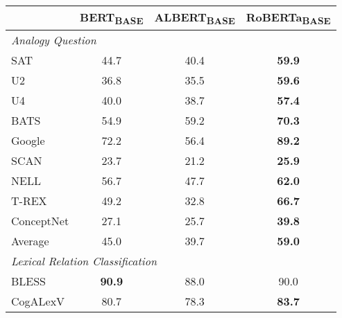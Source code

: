 \documentclass[3p]{elsarticle}
\begin{document}
{\begin{table}[t]
\centering
\begin{tabular}{lccc}
\toprule
                                         & BERT\textsubscript{BASE} & ALBERT\textsubscript{BASE} & RoBERTa\textsubscript{BASE} \\ \midrule
\multicolumn{4}{l}{\textit{Analogy Question}} \\
SAT                                      & 44.7                      & 40.4                        & \textbf{59.9}                         \\
U2                                       & 36.8                      & 35.5                        & \textbf{59.6}                         \\
U4                                       & 40.0                      & 38.7                        & \textbf{57.4}                         \\
BATS                                     & 54.9                      & 59.2                        & \textbf{70.3}                         \\
Google                                   & 72.2                      & 56.4                        & \textbf{89.2}                         \\
SCAN                                     & 23.7                      & 21.2                        & \textbf{25.9}                         \\
NELL                                     & 56.7                      & 47.7                        & \textbf{62.0}                         \\
T-REX                                    & 49.2                      & 32.8                        & \textbf{66.7}                         \\
ConceptNet                               & 27.1                      & 25.7                        & \textbf{39.8}                         \\ \midrule
Average                                  & 45.0                      & 39.7                        & \textbf{59.0}                         \\
\midrule
\multicolumn{4}{l}{\textit{Lexical Relation Classification}} \\ 
BLESS                                    & \textbf{90.9}                      & 88.0                        & 90.0                         \\
CogALexV                                 & 80.7                      & 78.3                        & \textbf{83.7}                         \\

\end{tabular}
\end{table}}
\end{document}
